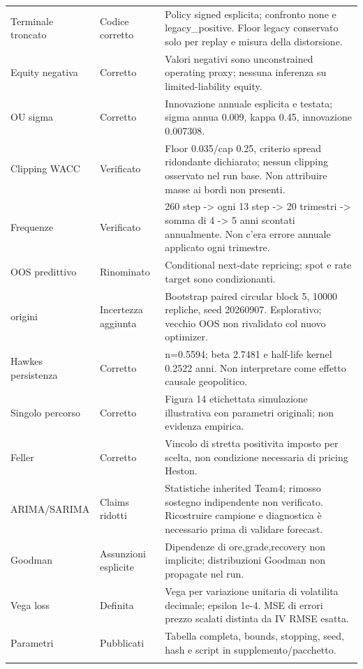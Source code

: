 \documentclass[10pt,a4paper]{article}
\begin{document}
\begin{longtable}{p{}p{}p{}}
Terminale troncato & Codice corretto & Policy signed esplicita; confronto none e legacy\_positive. Floor legacy conservato solo per replay e misura della distorsione. \\ \addlinespace
Equity negativa & Corretto & Valori negativi sono unconstrained operating proxy; nessuna inferenza su limited-liability equity. \\ \addlinespace
OU sigma & Corretto & Innovazione annuale esplicita e testata; sigma annua 0.009, kappa 0.45, innovazione 0.007308. \\ \addlinespace
Clipping WACC & Verificato & Floor 0.035/cap 0.25, criterio spread ridondante dichiarato; nessun clipping osservato nel run base. Non attribuire masse ai bordi non presenti. \\ \addlinespace
Frequenze & Verificato & 260 step -> ogni 13 step -> 20 trimestri -> somma di 4 -> 5 anni scontati annualmente. Non c’era errore annuale applicato ogni trimestre. \\ \addlinespace
OOS predittivo & Rinominato & Conditional next-date repricing; spot e rate target sono condizionanti. \\ \addlinespace
30 origini & Incertezza aggiunta & Bootstrap paired circular block 5, 10000 repliche, seed 20260907. Esplorativo; vecchio OOS non rivalidato col nuovo optimizer. \\ \addlinespace
Hawkes persistenza & Corretto & n=0.5594; beta 2.7481 e half-life kernel 0.2522 anni. Non interpretare come effetto causale geopolitico. \\ \addlinespace
Singolo percorso & Corretto & Figura 14 etichettata simulazione illustrativa con parametri originali; non evidenza empirica. \\ \addlinespace
Feller & Corretto & Vincolo di stretta positivita imposto per scelta, non condizione necessaria di pricing Heston. \\ \addlinespace
ARIMA/SARIMA & Claims ridotti & Statistiche inherited Team4; rimosso sostegno indipendente non verificato. Ricostruire campione e diagnostica è necessario prima di validare forecast. \\ \addlinespace
Goodman & Assunzioni esplicite & Dipendenze di ore,grade,recovery non implicite; distribuzioni Goodman non propagate nel run. \\ \addlinespace
Vega loss & Definita & Vega per variazione unitaria di volatilita decimale; epsilon 1e-4. MSE di errori prezzo scalati distinta da IV RMSE esatta. \\ \addlinespace
Parametri & Pubblicati & Tabella completa, bounds, stopping, seed, hash e script in supplemento/pacchetto. \\ \addlinespace

\end{longtable}
\end{document}
